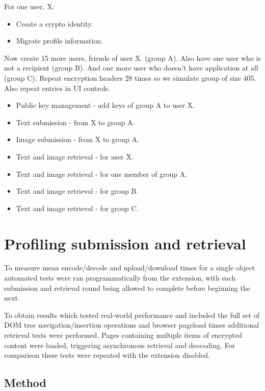 For one user, X:

\begin{itemize}
    \item Create a crypto identity.
    \item Migrate profile information.
\end{itemize}

Now create 15 more users, friends of user X. (group A). Also have one user who is not a recipient (group B). And one more user who doesn't have application at all (group C). Repeat encryption headers 28 times so we simulate group of size 405. Also repeat entries in UI controls.

\begin{itemize}
    \item Public key management - add keys of group A to user X.
    \item Text submission - from X to group A.
    \item Image submission - from X to group A.
    \item Text and image retrieval - for user X.
    \item Text and image retrieval - for one member of group A.
    \item Text and image retrieval - for group B.
    \item Text and image retrieval - for group C.
\end{itemize}

\section{Profiling submission and retrieval}

To measure mean encode/decode and upload/download times for a single object automated tests were ran programmatically from the extension, with each submission and retrieval round being allowed to complete before beginning the next.

To obtain results which tested real-world performance and included the full set of DOM tree navigation/insertion operations and browser pageload times additional retrieval tests were performed. Pages containing multiple items of encrypted content were loaded, triggering asynchronous retrieval and deocoding. For comparison these tests were repeated with the extension disabled.

\subsection{Method}

